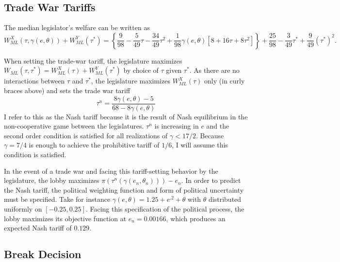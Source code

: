\documentclass[10pt]{article}
\newcommand{\ve}{\theta}
\newcommand{\ta}{\theta}
\newcommand{\ga}{\gamma}
\begin{document}
\subsection{Trade War Tariffs}
The median legislator's welfare can be written as 
\[
  W_{\mathit{ML}}^X(\tau,\ga(e,\ve)) + W_{\mathit{ML}}^Y(\tau^*) = \left\{\frac{9}{98} - \frac{5}{49}\tau - \frac{34}{49}\tau^2 +\frac{1}{98}\ga(e,\ve)\left[ 8 + 16\tau + 8\tau^2 \right] \right\}+ \frac{25}{98} - \frac{3}{49}\tau^* + \frac{9}{49}(\tau^*)^2.
\]

When setting the trade-war tariff, the legislature maximizes $W_{\mathit{ML}}(\tau, \tau^*) = W_{\mathit{ML}}^X(\tau) + W_{\mathit{ML}}^Y(\tau^*)$ by choice of $\tau$ given $\tau^*$. As there are no interactions between $\tau$ and $\tau^*$, the legislature maximizes $W_{\mathit{ML}}^X(\tau)$ only (in curly braces above) and sets the trade war tariff
\[
  \tau^n = \frac{8\ga(e,\ve)-5}{68-8\ga(e,\ve)}
\]
I refer to this as the Nash tariff because it is the result of Nash equilibrium in the non-cooperative game between the legislatures. $\tau^n$ is increasing in $e$ and the second order condition is satisfied for all realizations of $\ga < 17/2$. Because $\ga = 7/4$ is enough to achieve the prohibitive tariff of $1/6$, I will assume this condition is satisfied. 

In the event of a trade war and facing this tariff-setting behavior by the legislature, the lobby maximizes $\pi\left(\tau^n\left(\ga\left(e_n,\ve_n\right)\right)\right) - e_n$. In order to predict the Nash tariff, the political weighting function and form of political uncertainty must be specified. Take for instance $\ga(e,\ve) = 1.25 + e^{.2} + \ta$ with $\ve$ distributed uniformly on $[-0.25,0.25]$. Facing this specification of the political process, the lobby maximizes its objective function at $e_n = 0.00166$, which produces an expected Nash tariff of $0.129$.

\subsection{Break Decision}
\end{document}
